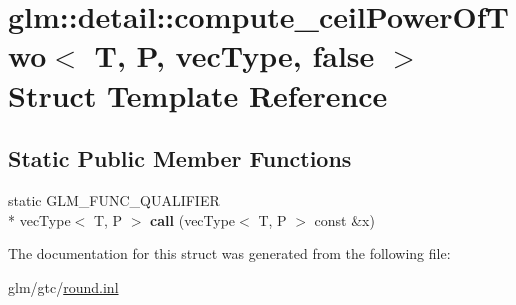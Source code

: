 \hypertarget{structglm_1_1detail_1_1compute__ceilPowerOfTwo_3_01T_00_01P_00_01vecType_00_01false_01_4}{\section{glm\-:\-:detail\-:\-:compute\-\_\-ceil\-Power\-Of\-Two$<$ T, P, vec\-Type, false $>$ Struct Template Reference}
\label{structglm_1_1detail_1_1compute__ceilPowerOfTwo_3_01T_00_01P_00_01vecType_00_01false_01_4}
}
\subsection*{Static Public Member Functions}
\begin{DoxyCompactItemize}
\item 
\hypertarget{structglm_1_1detail_1_1compute__ceilPowerOfTwo_3_01T_00_01P_00_01vecType_00_01false_01_4_a4b44424366238156e2a2d1b19ace1ad5}{static G\-L\-M\-\_\-\-F\-U\-N\-C\-\_\-\-Q\-U\-A\-L\-I\-F\-I\-E\-R \\*
vec\-Type$<$ T, P $>$ {\bfseries call} (vec\-Type$<$ T, P $>$ const \&x)}\label{structglm_1_1detail_1_1compute__ceilPowerOfTwo_3_01T_00_01P_00_01vecType_00_01false_01_4_a4b44424366238156e2a2d1b19ace1ad5}

\end{DoxyCompactItemize}


The documentation for this struct was generated from the following file\-:\begin{DoxyCompactItemize}
\item 
glm/gtc/\hyperlink{round_8inl}{round.\-inl}\end{DoxyCompactItemize}
